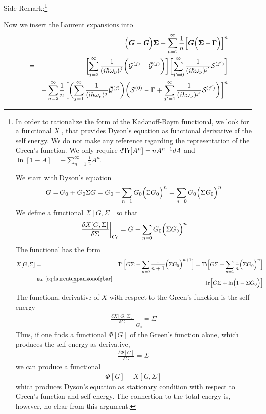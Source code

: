 \documentclass[11pt,a4paper]{report}
\begin{document}
Side Remark:\footnote{In order to rationalize the form of the
  Kadanoff-Baym functional, we look for a functional $X$ , that
  provides Dyson's equation as functional derivative of the self
  energy. We do not make any reference regarding the representation of
  the Green's function. We only require $d \mathrm{Tr}[A^n]=n A^{n-1}dA$ and
  $\ln[1-A]=-\sum_{n=1}^\infty \frac{1}{n}A^n$.

 We start with Dyson's equation
\begin{eqnarray}
G=G_{0}+G_0\Sigma G
=G_0+\sum_{n=1}G_0\Bigl(\Sigma G_0\Bigr)^n
=\sum_{n=0}G_0\Bigl(\Sigma G_0\Bigr)^n
\end{eqnarray}
We define a functional $X[G,\Sigma]$ so that
\begin{eqnarray}
\left.\frac{\delta X[G,\Sigma]}{\delta\Sigma}\right|_{G_0}=
G-\sum_{n=0}G_0\Bigl(\Sigma G_0\Bigr)^n
\end{eqnarray}
The functional has the form
\begin{eqnarray}
X[G,\Sigma]
&=&\Tr\Bigl[G\Sigma-\sum_{n=0}\frac{1}{n+1} \Bigl(\Sigma G_0\Bigr)^{n+1}\Bigr]
=\Tr\Bigl[G\Sigma-\sum_{n=1}\frac{1}{n} \Bigl(\Sigma G_0\Bigr)^{n}\Bigr]
\nonumber\\
&\eqrel{eq:laurentexpansionofgbar}{=}&
\Tr\Bigl[G\Sigma+\ln\Bigl(1-\Sigma G_0\Bigr)\Bigr]
\end{eqnarray}
The functional derivative of $X$ with respect to the Green's function is the
self energy
\begin{eqnarray}
\left.\frac{\delta X[G,\Sigma]}{\delta G}\right|_{G_0}=
\Sigma 
\end{eqnarray}
Thus, if one finds a functional $\Phi[G]$ of the Green's function
alone, which produces the self energy as derivative,
\begin{eqnarray}
\frac{\delta \Phi[G]}{\delta G}=\Sigma
\end{eqnarray}
we can produce a functional
\begin{eqnarray}
\Phi[G]-X[G,\Sigma]
\end{eqnarray}
which produces Dyson's equation as stationary condition with respect
to Green's function and self energy. The connection to the total
energy is, however, no clear from this argument.  }

Now we insert the Laurent expansions into
\begin{eqnarray}
&&\Bigl(\bm{G}-\bar{\bm{G}}\Bigr)\bm{\Sigma}
-\sum_{n=2}^\infty\frac{1}{n}
\Bigl[\bar{\bm{G}}\Bigl(\bm{\Sigma}-\bm{\Gamma}\Bigr)\Bigr]^n
\nonumber\\
&=&
\biggl[
\sum_{j=2}^\infty\frac{1}{(i\hbar\omega_\nu)^j}
\biggl(\mathcal{\bm{G}}^{(j)}-\bar{\mathcal{\bm{G}}}^{(j)}
\biggr)
\biggr]
\biggl[
\sum_{j'=0}^\infty\frac{1}{(i\hbar\omega_\nu)^{j'}}
\mathcal{\bm{S}}^{(j')}
\biggr]
\nonumber\\
&&-
\sum_{n=2}^\infty\frac{1}{n}
\biggl[
\biggl(
\sum_{j=1}^\infty\frac{1}{(i\hbar\omega_\nu)^j}
\bar{\mathcal{\bm{G}}}^{(j)}
\biggr)
\biggl(\mathcal{\bm{S}}^{(0)}-\bm{\Gamma}
+\sum_{j'=1}^\infty\frac{1}{(i\hbar\omega_\nu)^{j'}}\mathcal{\bm{S}}^{(j')}
\biggl)
\biggr]^n
\end{eqnarray}
\end{document}
